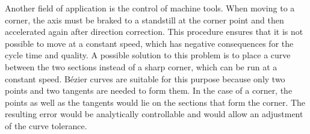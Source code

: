  \bigskip
 

Another field of application is the control of machine tools. When moving to a corner, the axis must be braked to a standstill at the corner point and then accelerated again after direction correction. This procedure ensures that it is not possible to move at a constant speed, which has negative consequences for the cycle time and quality. A possible solution to this problem is to place a curve between the two sections instead of a sharp corner, which can be run at a constant speed. Bézier curves are suitable for this purpose because only two points and two tangents are needed to form them. In the case of a corner, the points as well as the tangents would lie on the sections that form the corner. The resulting error would be analytically controllable and would allow an adjustment of the curve tolerance.\cite{Sencer:2014}